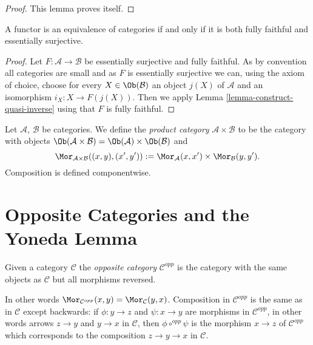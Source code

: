 \begin{proof}
This lemma proves itself.
\end{proof}

\begin{lemma}
\label{lemma-equivalence-categories}
A functor is an equivalence of categories if and only if it is both fully
faithful and essentially surjective.
\end{lemma}

\begin{proof}
Let $F : \mathcal{A} \to \mathcal{B}$ be essentially surjective and fully
faithful. As by convention all categories are small and as $F$ is essentially
surjective we can, using the axiom of choice, choose for every
$X \in \Ob(\mathcal{B})$ an object $j(X)$ of $\mathcal{A}$ and an
isomorphism $i_X : X \to F(j(X))$. Then we apply
Lemma \ref{lemma-construct-quasi-inverse}
using that $F$ is fully faithful.
\end{proof}

\begin{definition}
\label{definition-product-category}
Let $\mathcal{A}$, $\mathcal{B}$ be categories.
We define the {\it product category}
$\mathcal{A} \times \mathcal{B}$ to be the category with
objects
$\Ob(\mathcal{A} \times \mathcal{B}) =
\Ob(\mathcal{A}) \times \Ob(\mathcal{B})$
and
$$
\Mor_{\mathcal{A} \times \mathcal{B}}((x, y), (x', y'))
:=
\Mor_\mathcal{A}(x, x')\times
\Mor_\mathcal{B}(y, y').
$$
Composition is defined componentwise.
\end{definition}


\section{Opposite Categories and the Yoneda Lemma}
\label{section-opposite}

\begin{definition}
\label{definition-opposite}
Given a category $\mathcal{C}$ the {\it opposite category}
$\mathcal{C}^{opp}$ is the category with the same objects
as $\mathcal{C}$ but all morphisms reversed.
\end{definition}

\noindent
In other words
$\Mor_{\mathcal{C}^{opp}}(x, y) = \Mor_\mathcal{C}(y, x)$.
Composition in $\mathcal{C}^{opp}$ is the same as in $\mathcal{C}$
except backwards: if $\phi : y \to z$ and $\psi : x \to y$
are morphisms in $\mathcal{C}^{opp}$, in other words arrows
$z \to y$ and $y \to x$ in $\mathcal{C}$,
then $\phi \circ^{opp} \psi$ is the morphism $x \to z$
of $\mathcal{C}^{opp}$ which corresponds to the composition
$z \to y \to x$ in $\mathcal{C}$.


